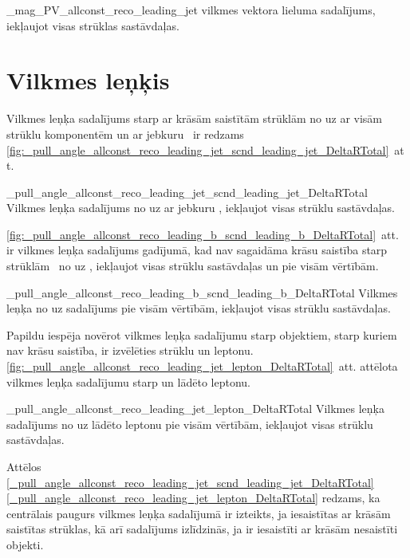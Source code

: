           {_mag_PV_allconst_reco_leading_jet}
          {\leadingjet vilkmes vektora lieluma sadalījums, iekļaujot visas strūklas sastāvdaļas.}

\section{Vilkmes leņķis}

Vilkmes leņķa sadalījums starp ar krāsām saistītām strūklām  no \leadingjet uz \scndleadingjet ar visām strūklu komponentēm un ar jebkuru \DeltaR\ ir redzams \ref{fig:_pull_angle_allconst_reco_leading_jet_scnd_leading_jet_DeltaRTotal}~att.

          {_pull_angle_allconst_reco_leading_jet_scnd_leading_jet_DeltaRTotal}
          {Vilkmes leņķa sadalījums no \leadingjet uz \scndleadingjet ar jebkuru \DeltaR, iekļaujot visas strūklu sastāvdaļas.}


\ref{fig:_pull_angle_allconst_reco_leading_b_scnd_leading_b_DeltaRTotal}~att. ir vilkmes leņķa sadalījums gadījumā, kad nav sagaidāma krāsu saistība starp strūklām \textendash\ no \leadingb uz \scndleadingb, iekļaujot visas strūklu sastāvdaļas un pie visām \DeltaR vērtībām.

          {_pull_angle_allconst_reco_leading_b_scnd_leading_b_DeltaRTotal}
          {Vilkmes leņķa no \leadingb uz \scndleadingb sadalījums pie visām \DeltaR vērtībām, iekļaujot visas strūklu sastāvdaļas.}

Papildu iespēja novērot vilkmes leņķa sadalījumu starp objektiem, starp kuriem nav krāsu saistība, ir izvēlēties strūklu un leptonu. \ref{fig:_pull_angle_allconst_reco_leading_jet_lepton_DeltaRTotal}~att. attēlota vilkmes leņķa sadalījumu starp \leadingjet un lādēto leptonu. 

          {_pull_angle_allconst_reco_leading_jet_lepton_DeltaRTotal}
          {Vilkmes leņķa sadalījums no \leadingjet uz lādēto leptonu pie visām \DeltaR vērtībām, iekļaujot visas strūklu sastāvdaļas.}

Attēlos \ref{_pull_angle_allconst_reco_leading_jet_scnd_leading_jet_DeltaRTotal}\textendash\ref{_pull_angle_allconst_reco_leading_jet_lepton_DeltaRTotal} redzams, ka centrālais paugurs vilkmes leņķa sadalījumā ir izteikts, ja iesaistītas ar krāsām saistītas strūklas, kā arī sadalījums izlīdzinās, ja ir iesaistīti ar krāsām nesaistīti objekti. 

